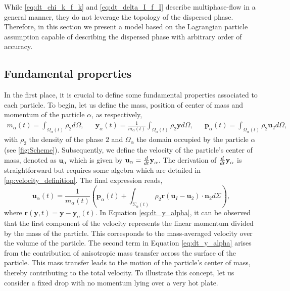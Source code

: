 
While \ref{eq:dt_chi_k_f_k} and \ref{eq:dt_delta_I_f_I} describe multiphase-flow in a general manner, they do not leverage the topology of the dispersed phase. 
Therefore, in this section we present a model based on the Lagrangian particle assumption capable of describing the dispersed phase with arbitrary order of accuracy. 

\subsection{Fundamental properties}
In the first place, it is crucial to define some fundamental properties associated to each particle.
To begin, let us define the mass, position of center of mass and momentum of the particle $\alpha$, as respectively,
\begin{align}
    m_\alpha(t)
    = \int_{\Omega_\alpha(t)} \rho_2  d\Omega,
    &&
    \textbf{y}_\alpha(t)
    = \frac{1}{m_\alpha(t) }\int_{\Omega_\alpha(t)} \rho_2 \textbf{y} d\Omega,
    &&
    \textbf{p}_\alpha(t) 
    = \int_{\Omega_\alpha(t)} \rho_2 \textbf{u}_2 d\Omega,
    \label{eq:position_and_momentum_def}
\end{align}
with $\rho_2$ the density of the phase $2$ and $\Omega_\alpha$ the domain occupied by the particle $\alpha$ (see \ref{fig:Scheme}). 
Subsequently, we define the velocity of the particle's center of mass, denoted as $\textbf{u}_\alpha$ which is given by $\textbf{u}_\alpha = \frac{d}{d t} \textbf{y}_\alpha$. 
The derivation of $\frac{d}{d t} \textbf{y}_\alpha$ is straightforward but requires some algebra which are detailed in \ref{ap:velocity_definition}. 
The final expression reads,
\begin{equation}
    \textbf{u}_\alpha(t) = \frac{1}{m_\alpha(t)} \left(
        \textbf{p}_\alpha(t)
        +  \int_{\Sigma_\alpha(t)} \rho_2 \textbf{r} (\textbf{u}_I - \textbf{u}_2)\cdot \textbf{n}_2 d\Sigma
        \right),
        \label{eq:dt_y_alpha}
\end{equation}
where $\textbf{r}(\textbf{y},t) = \textbf{y} - \textbf{y}_\alpha(t)$. 
In Equation \ref{eq:dt_y_alpha}, it can be observed that the first component of the velocity represents the linear momentum divided by the mass of the particle. 
This corresponds to the mass-averaged velocity over the volume of the particle.
The second term in Equation \ref{eq:dt_y_alpha} arises from the contribution of anisotropic mass transfer across the surface of the particle. 
This mass transfer leads to the motion of the particle's center of mass, thereby contributing to the total velocity.
To illustrate this concept, let us consider a fixed drop with no momentum lying over a very hot plate.
